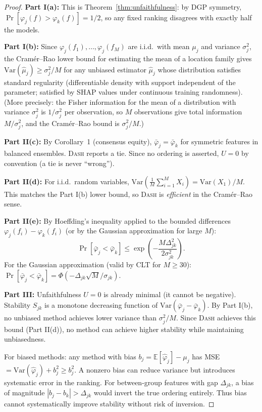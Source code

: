 \documentclass{article}
\newcommand{\Var}{\mathrm{Var}}
\newcommand{\DASH}{\textsc{Dash}}
\begin{document}
\begin{proof}
\textbf{Part I(a):} This is Theorem~\ref{thm:unfaithfulness}: by DGP
symmetry, $\Pr[\varphi_j(f) > \varphi_k(f)] = 1/2$, so any fixed
ranking disagrees with exactly half the models.

\textbf{Part I(b):} Since $\varphi_j(f_1), \ldots, \varphi_j(f_M)$
are i.i.d.\ with mean $\mu_j$ and variance $\sigma_j^2$, the
Cram\'er--Rao lower bound for estimating the mean of a location
family gives $\Var(\hat\mu_j) \geq \sigma_j^2/M$ for any unbiased
estimator $\hat\mu_j$ whose distribution satisfies standard regularity
(differentiable density with support independent of the parameter;
satisfied by SHAP values under continuous training randomness).
(More precisely: the Fisher information for the mean of a distribution
with variance $\sigma_j^2$ is $1/\sigma_j^2$ per observation, so $M$
observations give total information $M/\sigma_j^2$, and the Cram\'er--Rao
bound is $\sigma_j^2/M$.)

\textbf{Part II(c):} By Corollary~1 (consensus equity),
$\bar\varphi_j = \bar\varphi_k$ for symmetric features in balanced
ensembles. \DASH{} reports a tie. Since no ordering is asserted,
$U = 0$ by convention (a tie is never ``wrong'').

\textbf{Part II(d):} For i.i.d.\ random variables,
$\Var(\frac{1}{M}\sum_{i=1}^M X_i) = \Var(X_1)/M$.
This matches the Part I(b) lower bound, so \DASH{} is \emph{efficient}
in the Cram\'er--Rao sense.

\textbf{Part II(e):} By Hoeffding's inequality applied to the
bounded differences $\varphi_j(f_i) - \varphi_k(f_i)$ (or by the
Gaussian approximation for large $M$):
\[
    \Pr[\bar\varphi_j < \bar\varphi_k]
    \leq \exp\!\left(-\frac{M\Delta_{jk}^2}{2\sigma_{jk}^2}\right).
\]
For the Gaussian approximation (valid by CLT for $M \geq 30$):
$\Pr[\bar\varphi_j < \bar\varphi_k] =
\Phi(-\Delta_{jk}\sqrt{M}/\sigma_{jk})$.

\textbf{Part III:} Unfaithfulness $U = 0$ is already minimal (it
cannot be negative). Stability $S_{jk}$ is a monotone decreasing
function of $\Var(\bar\varphi_j - \bar\varphi_k)$. By Part I(b),
no unbiased method achieves lower variance than $\sigma_j^2/M$.
Since \DASH{} achieves this bound (Part II(d)), no method can
achieve higher stability while maintaining unbiasedness.

For biased methods: any method with bias $b_j = \mathbb{E}[\hat\varphi_j] - \mu_j$ has MSE $= \Var(\hat\varphi_j) + b_j^2 \geq b_j^2$. A nonzero bias can reduce variance but introduces systematic error in the ranking. For between-group features with gap $\Delta_{jk}$, a bias of magnitude $|b_j - b_k| > \Delta_{jk}$ would invert the true ordering entirely. Thus bias cannot systematically improve stability without risk of inversion.
\end{proof}
\end{document}
